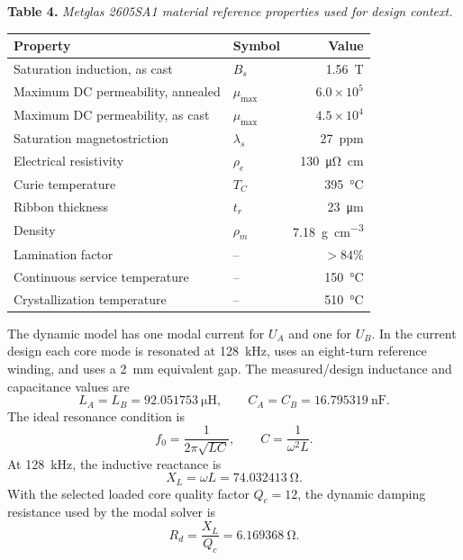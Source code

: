 \begin{table}[H]
\centering
\textbf{Table 4.} \emph{Metglas 2605SA1 material reference properties used for design context.}

\smallskip
\begin{tabular}{llr}
\toprule
Property & Symbol & Value \\
\midrule
Saturation induction, as cast & \(B_s\) & \SI{1.56}{\tesla} \\
Maximum DC permeability, annealed & \(\mu_{\max}\) & \(6.0\times10^5\) \\
Maximum DC permeability, as cast & \(\mu_{\max}\) & \(4.5\times10^4\) \\
Saturation magnetostriction & \(\lambda_s\) & \SI{27}{ppm} \\
Electrical resistivity & \(\rho_e\) & \SI{130}{\micro\ohm\centi\metre} \\
Curie temperature & \(T_C\) & \SI{395}{\celsius} \\
Ribbon thickness & \(t_r\) & \SI{23}{\micro\metre} \\
Density & \(\rho_m\) & \SI{7.18}{\gram\per\centi\metre\cubed} \\
Lamination factor & -- & \(>84\%\) \\
Continuous service temperature & -- & \SI{150}{\celsius} \\
Crystallization temperature & -- & \SI{510}{\celsius} \\
\bottomrule
\end{tabular}
\end{table}

The dynamic model has one modal current for \(U_A\) and one for \(U_B\). In the
current design each core mode is resonated at \SI{128}{\kilo\hertz}, uses an
eight-turn reference winding, and uses a \SI{2}{\milli\metre} equivalent gap.
The measured/design inductance and capacitance values are
\begin{equation}
L_A=L_B=\SI{92.051753}{\micro\henry}, \qquad
C_A=C_B=\SI{16.795319}{\nano\farad}.
\end{equation}
The ideal resonance condition is
\begin{equation}
f_0 = \frac{1}{2\pi\sqrt{LC}}, \qquad
C = \frac{1}{\omega^2 L}.
\end{equation}
At \SI{128}{\kilo\hertz}, the inductive reactance is
\begin{equation}
X_L = \omega L = \SI{74.032413}{\ohm}.
\end{equation}
With the selected loaded core quality factor \(Q_c=12\), the dynamic damping
resistance used by the modal solver is
\begin{equation}
R_d = \frac{X_L}{Q_c} = \SI{6.169368}{\ohm}.
\end{equation}

